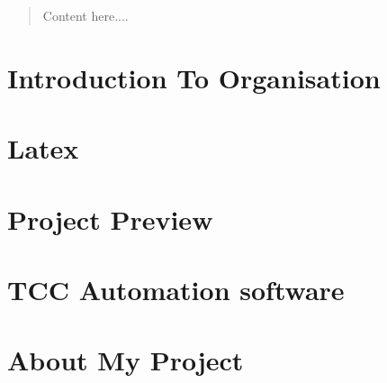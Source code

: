 \documentclass[12pt]{myclass}
\subtitle{subtitle}
\author{Sandeep Kaur}
\begin{document}
 \maketitle                                 %


\cfoot{\thepage}                       %

\begin{abstract}
Content here....
\end{abstract}

%




\tableofcontents                       %

\listoffigures                         %
\newpage

\cfoot{\thepage}                        %



\section{Introduction To Organisation}

\newpage
\section{Latex}

\newpage
\section{Project Preview}

\newpage
\section{TCC Automation software}

\newpage
\section{About My Project}




\end{document}

